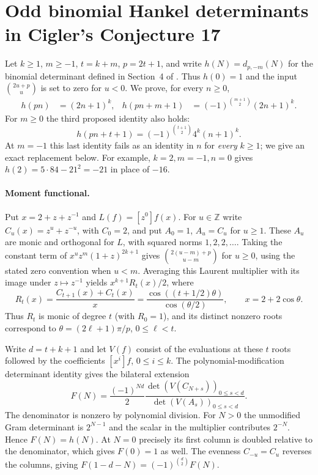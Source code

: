\documentclass[11pt,a4paper]{article}
\begin{document}
\section{Odd binomial Hankel determinants in Cigler's Conjecture 17}
Let $k\ge1$, $m\ge-1$, $t=k+m$, $p=2t+1$, and write
$h(N)=d_{p,-m}(N)$ for the binomial determinant defined in
Section~4 of \cite{C23}. Thus $h(0)=1$ and the input
$\binom{2u+p}{u}$ is set to zero for $u<0$.
We prove, for every $n\ge0$,
\begin{align}
 h(pn)&=(2n+1)^k, &
 h(pn+m+1)&=(-1)^{\binom{m+1}{2}}(2n+1)^k.\label{eq:odd17a}
\end{align}
For $m\ge0$ the third proposed identity also holds:
\begin{equation}
 h(pn+t+1)=(-1)^{\binom{t+1}{2}}4^k(n+1)^k.\label{eq:odd17b}
\end{equation}
At $m=-1$ this last identity fails as an identity in $n$ for
\emph{every} $k\ge1$; we give an exact replacement below.
For example, $k=2,m=-1,n=0$ gives
$h(2)=5\cdot84-21^2=-21$ in place of $-16$.

\paragraph{Moment functional.}
Put $x=2+z+z^{-1}$ and $L(f)=[z^0]f(x)$. For $u\in\mathbb Z$ write
$C_u(x)=z^u+z^{-u}$, with $C_0=2$, and put $A_0=1$, $A_u=C_u$ for
$u\ge1$. These $A_u$ are monic and orthogonal for $L$, with squared
norms $1,2,2,\ldots$. Taking the constant term of
$x^u z^m(1+z)^{2k+1}$ gives
$\binom{2(u-m)+p}{u-m}$ for $u\ge0$, using the stated zero convention
when $u<m$. Averaging this Laurent multiplier with its image under
$z\mapsto z^{-1}$ yields $x^{k+1}R_t(x)/2$, where
\[
 R_t(x)=\frac{C_{t+1}(x)+C_t(x)}{x}
       =\frac{\cos((t+1/2)\theta)}{\cos(\theta/2)},
 \qquad x=2+2\cos\theta.
\]
Thus $R_t$ is monic of degree $t$ (with $R_0=1$), and its distinct
nonzero roots correspond to
$\theta=(2\ell+1)\pi/p$, $0\le\ell<t$.

Write $d=t+k+1$ and let $V(f)$ consist of the evaluations at these
$t$ roots followed by the coefficients $[x^i]f$, $0\le i\le k$.
The polynomial-modification determinant identity gives the bilateral
extension
\[
 F(N)=\frac{(-1)^{Nd}}{2}
 \frac{\det(V(C_{N+s}))_{0\le s<d}}
      {\det(V(A_s))_{0\le s<d}}.
\]
The denominator is nonzero by polynomial division. For $N>0$ the
unmodified Gram determinant is $2^{N-1}$ and the scalar
in the multiplier contributes $2^{-N}$. Hence $F(N)=h(N)$.
At $N=0$ precisely its first column is doubled relative to the
denominator, which gives $F(0)=1$ as well. The evenness $C_{-u}=C_u$
reverses the columns, giving
$F(1-d-N)=(-1)^{\binom d2}F(N)$.
\end{document}
